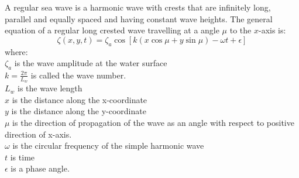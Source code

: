 A regular sea wave is a harmonic wave with crests that are infinitely long,
parallel and equally spaced and having constant wave heights. The general 
equation of a regular long crested wave travelling at a angle $\mu$ to the 
$x$-axis is:
\begin{equation}
  \zeta (x,y,t) = \zeta_a \cos[k(x \cos \mu + y \sin \mu) - \omega t + \epsilon]
  \label {eq: 2D wave equation}
\end{equation}
where: \\ 
$\zeta_a$ is the wave amplitude at the water surface\\ 
$k = \frac{2 \pi}{L_w}$ is called the wave number.\\ 
$L_w$ is the wave length\\ 
$x$ is the distance along the x-coordinate\\
$y$ is the distance along the y-coordinate\\
$\mu$ is the direction of propagation of the wave as an angle with respect to
positive direction of x-axis.\\
$\omega$ is the circular frequency of the simple harmonic wave\\
$t$ is time\\
$\epsilon$ is a phase angle. 


